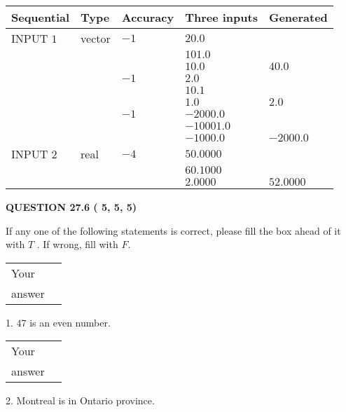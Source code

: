 \documentclass[12pt]{article}
\begin{document}
   
  
  
\noindent\begin{tabular}{|l|l|l|l|l|}
\hline
 Sequential & Type & Accuracy & Three inputs & Generated \\ 
\hline
 
 
  INPUT $           1$ & vector & $          -1 $ & $
20.0
  $ & \\
  & & & $
101.0
  $ & \\
  & & & $
10.0
$ & $ 40.0 $ 
  \\
  & & $          -1 $ & $
2.0
  $ & \\
  & & & $
10.1
  $ & \\
  & & & $
1.0
$ & $ 2.0 $ 
  \\
  & & $          -1 $ & $
-2000.0
  $ & \\
  & & & $
-10001.0
  $ & \\
  & & & $
-1000.0
$ & $ -2000.0 $ 
 \\  \hline  
 
 
  INPUT $           2$ & real & $          -4 $ & $
 50.0000
  $ & \\
  & & &  $
 60.1000
  $ & \\
  & & &  $
 2.0000
 $ & $ 52.0000 $ 
 \\  \hline  
 \end{tabular}
   
   
  
\vspace{0.2in}
  
{\textbf{\Large{QUESTION
27.6 
 (          5,          5,          5)
}}}
  
  
If any one of the following statements is correct, please fill the box ahead of it with $T$ .
If wrong, fill with $F$.
 
\noindent\begin{tabular}{|l|l|}\hline Your&\hspace{.2in} \\ answer&\hspace{.2in} \\ \hline \end{tabular}
1. $ %
47$ is an  %
even number.
 
\noindent\begin{tabular}{|l|l|}\hline Your&\hspace{.2in} \\ answer&\hspace{.2in} \\ \hline \end{tabular}
2.  %
Montreal is in  %
Ontario province.
 
\end{document}
